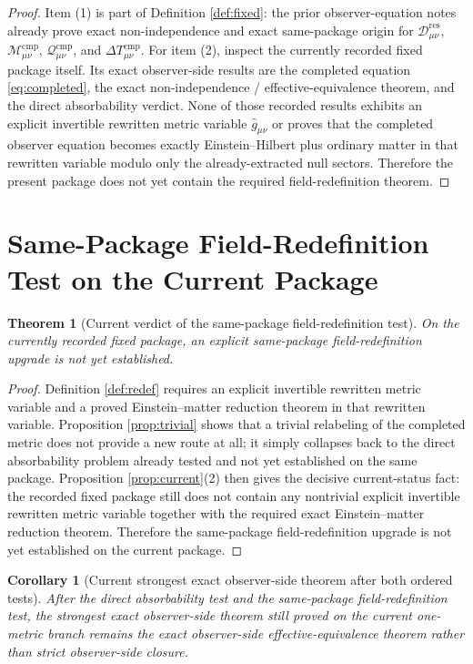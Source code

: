 \documentclass[11pt]{article}
\newcommand{\RedefMetric}{\widehat g}
\newcommand{\ResidualDec}{\mathcal D_{\mu\nu}^{\mathrm{res}}}
\newcommand{\CompMix}{\mathcal M_{\mu\nu}^{\mathrm{cmp}}}
\newcommand{\CompQuad}{\mathcal Q_{\mu\nu}^{\mathrm{cmp}}}
\newcommand{\DeltaTComp}{\Delta T_{\mu\nu}^{\mathrm{cmp}}}
\newtheorem{corollary}{Corollary}
\newtheorem{theorem}{Theorem}
\begin{document}
\begin{proof}
Item (1) is part of Definition \ref{def:fixed}: the prior observer-equation notes already prove exact non-independence and exact same-package origin for \(\ResidualDec\), \(\CompMix\), \(\CompQuad\), and \(\DeltaTComp\). For item (2), inspect the currently recorded fixed package itself. Its exact observer-side results are the completed equation \eqref{eq:completed}, the exact non-independence / effective-equivalence theorem, and the direct absorbability verdict. None of those recorded results exhibits an explicit invertible rewritten metric variable \(\RedefMetric_{\mu\nu}\) or proves that the completed observer equation becomes exactly Einstein--Hilbert plus ordinary matter in that rewritten variable modulo only the already-extracted null sectors. Therefore the present package does not yet contain the required field-redefinition theorem.
\end{proof}

\section{Same-Package Field-Redefinition Test on the Current Package}

\begin{theorem}[Current verdict of the same-package field-redefinition test]
\label{thm:test}
On the currently recorded fixed package, an explicit same-package field-redefinition upgrade is not yet established.
\end{theorem}

\begin{proof}
Definition \ref{def:redef} requires an explicit invertible rewritten metric variable and a proved Einstein--matter reduction theorem in that rewritten variable. Proposition \ref{prop:trivial} shows that a trivial relabeling of the completed metric does not provide a new route at all; it simply collapses back to the direct absorbability problem already tested and not yet established on the same package. Proposition \ref{prop:current}(2) then gives the decisive current-status fact: the recorded fixed package still does not contain any nontrivial explicit invertible rewritten metric variable together with the required exact Einstein--matter reduction theorem. Therefore the same-package field-redefinition upgrade is not yet established on the current package.
\end{proof}

\begin{corollary}[Current strongest exact observer-side theorem after both ordered tests]
\label{cor:strongest}
After the direct absorbability test and the same-package field-redefinition test, the strongest exact observer-side theorem still proved on the current one-metric branch remains the exact observer-side effective-equivalence theorem rather than strict observer-side closure.
\end{corollary}
\end{document}

